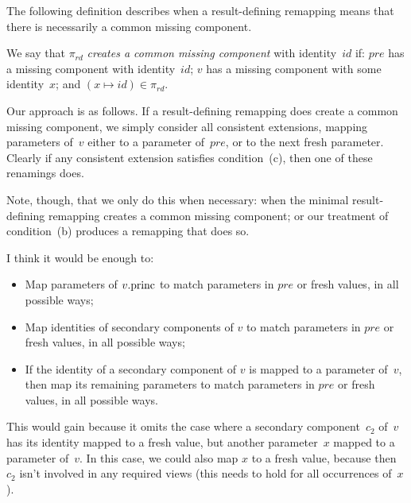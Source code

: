 

The following definition describes when a result-defining remapping means that
there is necessarily a common missing component.
%
\begin{definition}
We say that $\pi_{rd}$ \emph{creates a common missing component} with
identity~$id$ if: $pre$ has a missing component with identity~$id$; $v$ has a
missing component with some identity~$x$; and $(x \mapsto id) \in \pi_{rd}$.
\end{definition}

Our approach is as follows.  If a result-defining remapping does create a
common missing component, we simply consider all consistent extensions,
mapping parameters of~$v$ either to a parameter of~$pre$, or to the next fresh
parameter.  Clearly if any consistent extension satisfies condition~(c), then
one of these renamings does.

Note, though, that we only do this when necessary: when the minimal
result-defining remapping creates a common missing component; or our treatment
of condition~(b) produces a remapping that does so.


\begin{conjecture}
I think it would be enough to:
\begin{itemize}
\item Map parameters of $v.\mathrm{princ}$ to match parameters in $pre$ or fresh
  values, in all possible ways;

\item Map identities of secondary components of $v$ to match parameters in
  $pre$ or fresh values, in all possible ways;

\item If the identity of a secondary component of $v$ is mapped to a parameter
of~$v$, then map its remaining parameters to match parameters in $pre$
or fresh values, in all possible ways.
\end{itemize}
%
This would gain because it omits the case where a secondary component~$c_2$
of~$v$ has its identity mapped to a fresh value, but another parameter~$x$
mapped to a parameter of~$v$.  In this case, we could also map $x$ to a fresh
value, because then $c_2$ isn't involved in any required views (this needs to
hold for all occurrences of~$x$).
\end{conjecture}


